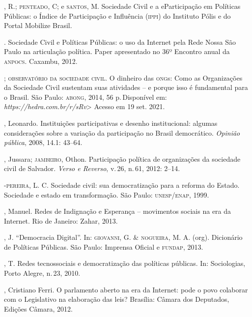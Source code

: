 \begin{bibliohedra}
, R.; \textsc{penteado}, C; e \textsc{santos}, M. Sociedade Civil e a eParticipação
em Políticas Públicas: o Índice de Participação e Influência (\textsc{ippi}) do
Instituto Pólis e do Portal Mobilize Brasil.

\titidem.
Sociedade Civil e Políticas Públicas: o uso da Internet pela Rede Nossa
São Paulo na articulação política. Paper apresentado no 36º Encontro
anual da \textsc{\textsc{anpocs}}. Caxambu, 2012.


; \textsc{observatório
da sociedade civil}. O dinheiro das \textsc{ong}s: Como as Organizações da
Sociedade Civil sustentam suas atividades -- e porque isso é fundamental
para o Brasil. São Paulo: \textsc{abong}, 2014, 56 p.\,Disponível em:
\emph{https://hedra.com.br/r/sRv}>
Acesso em 19 set. 2021.

, Leonardo. Instituições participativas e desenho institucional:
algumas considerações sobre a variação da participação no Brasil
democrático. \emph{Opinião pública}, 2008, 14.1: 43--64.

, Jussara; \textsc{jambeiro}, Othon. Participação política de organizações
da sociedade civil de Salvador. \emph{Verso e Reverso}, v.\,26, n.\,61,
2012: 2--14.

-\textsc{pereira}, L. C. Sociedade civil: sua democratização para a
reforma do Estado. Sociedade e estado em transformação. São Paulo:
\textsc{unesp}/\textsc{enap}, 1999.

, Manuel. Redes de Indignação e Esperança -- movimentos sociais
na era da Internet. Rio de Janeiro: Zahar, 2013.

, J. ``Democracia Digital''. In: \textsc{giovanni}, G. \& \textsc{nogueira}, M. A.
(org). Dicionário de Políticas Públicas. São Paulo: Imprensa Oficial e
\textsc{fundap}, 2013.

, T. Redes tecnossociais e democratização das políticas públicas.
In: Sociologias, Porto Alegre, n.\,23, 2010.

, Cristiano Ferri. O parlamento aberto na era da Internet: pode o
povo colaborar com o Legislativo na elaboração das leis? Brasília:
Câmara dos Deputados, Edições Câmara, 2012.


\end{bibliohedra}
